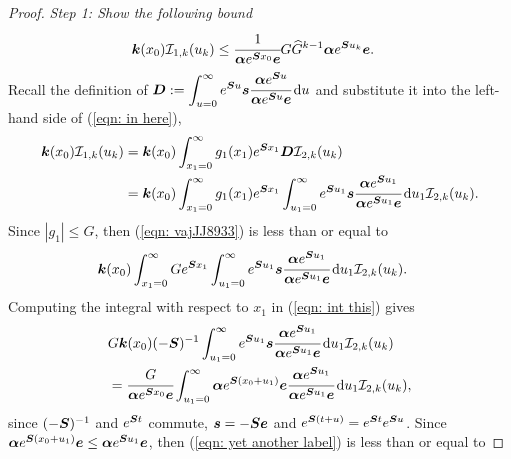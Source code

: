 \begin{proof}
	\emph{Step 1: Show the following bound}
	\begin{align}
		\boldsymbol k(x_0)\mathcal I_{1,k}(u_k) 
            	&\leq \cfrac{1}{\boldsymbol \alpha e^{\boldsymbol{S}x_0}\boldsymbol e}G\widehat G^{k-1} \boldsymbol \alpha e^{\boldsymbol{S}u_k}\boldsymbol e.\label{eqn: in here}
	\end{align}
	Recall the definition of \(\boldsymbol{D}:=\displaystyle\int_{u=0}^\infty e^{\boldsymbol{S}u}\boldsymbol s \cfrac{\boldsymbol \alpha e^{\boldsymbol{S}u}}{\boldsymbol \alpha e^{\boldsymbol{S}u}\boldsymbol e}\, \mathrm{d} u\) and substitute it into the left-hand side of (\ref{eqn: in here}), 
	\begin{align}
		\boldsymbol k(x_0) \mathcal I_{1,k}(u_k) &=\boldsymbol k(x_0) \int_{x_1=0}^\infty g_1(x_1) e^{\boldsymbol{S}x_1} \boldsymbol{D} \mathcal I_{2,k}(u_k)\nonumber 
		\\&=\boldsymbol k(x_0)\int_{x_1=0}^\infty g_1(x_1) e^{\boldsymbol{S}x_1} \int_{u_1=0}^\infty e^{\boldsymbol{S}u_1}\boldsymbol s \cfrac{\boldsymbol \alpha e^{\boldsymbol{S}u_1}}{\boldsymbol \alpha e^{\boldsymbol{S}u_1}\boldsymbol e}\, \mathrm{d} u_1 \mathcal I_{2,k}(u_k). \label{eqn: vajJJ8933}
	\end{align}
	Since \(|g_1|\leq G\), then (\ref{eqn: vajJJ8933}) is less than or equal to
	\begin{align}
		&\boldsymbol k(x_0) \int_{x_1=0}^\infty G  e^{\boldsymbol{S}x_1} \int_{u_1=0}^\infty e^{\boldsymbol{S}u_1}\boldsymbol s \cfrac{\boldsymbol \alpha e^{\boldsymbol{S}u_1}}{\boldsymbol \alpha e^{\boldsymbol{S}u_1}\boldsymbol e}\, \mathrm{d} u_1 \mathcal I_{2,k}(u_k).\label{eqn: int this}
	\end{align}
	Computing the integral with respect to \(x_1\) in (\ref{eqn: int this}) gives 
	\begin{align}
		 &G  \boldsymbol k(x_0)(-\boldsymbol{S})^{-1} \int_{u_1=0}^\infty e^{\boldsymbol{S}u_1}\boldsymbol s \cfrac{\boldsymbol \alpha e^{\boldsymbol{S}u_1}}{\boldsymbol \alpha e^{\boldsymbol{S}u_1}\boldsymbol e}\, \mathrm{d} u_1 \mathcal I_{2,k}(u_k)  \nonumber
		\\&=  \cfrac{G}{\boldsymbol \alpha e^{\boldsymbol{S}x_0}\boldsymbol e} \int_{u_1=0}^\infty \boldsymbol \alpha e^{\boldsymbol{S}(x_0+u_1)}\boldsymbol e \cfrac{\boldsymbol \alpha e^{\boldsymbol{S}u_1}}{\boldsymbol \alpha e^{\boldsymbol{S}u_1}\boldsymbol e}\, \mathrm{d} u_1\mathcal I_{2,k}(u_k), \label{eqn: yet another label}
	\end{align}
	since \((-\boldsymbol{S})^{-1}\) and \(e^{\boldsymbol{S}t}\) commute, \(\boldsymbol s = - \boldsymbol{S} \boldsymbol e \) and \(e^{\boldsymbol{S}(t+u)} = e^{\boldsymbol{S}t}e^{\boldsymbol{S}u}\). 
	Since \( \boldsymbol \alpha e^{\boldsymbol{S}(x_0 +u_1)}\boldsymbol e \leq \boldsymbol \alpha e^{\boldsymbol{S}u_1}\boldsymbol e \), then (\ref{eqn: yet another label}) is less than or equal to 

\end{proof}
